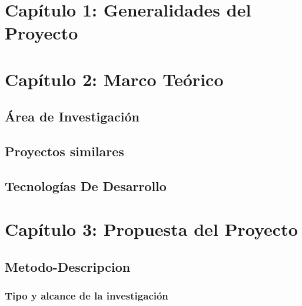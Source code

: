 \documentclass{extbook}
\begin{document}


\tableofcontents
\listoffigures
\listoftables

\chapter{Capítulo 1: Generalidades del Proyecto}







\chapter{Capítulo 2: Marco Teórico}
\section{Área de Investigación}






\section{Proyectos similares}

\section{Tecnologías De Desarrollo}


\chapter{Capítulo 3: Propuesta del Proyecto}
\section{Metodo-Descripcion}
\subsection{Tipo y alcance de la investigación}

\end{document}
